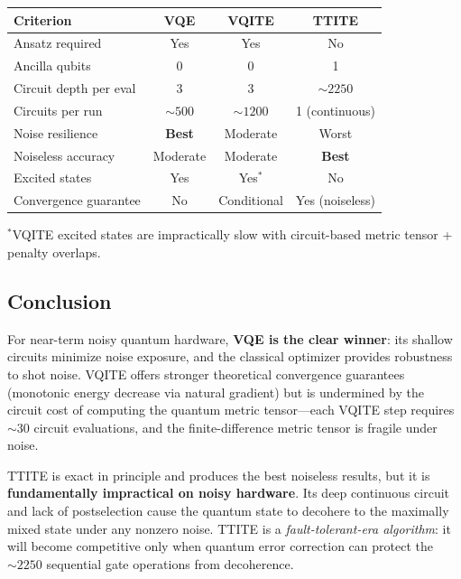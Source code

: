 \documentclass[11pt,a4paper]{article}
\begin{document}
\begin{center}
\begin{tabular}{@{}l c c c@{}}
\toprule
Criterion & VQE & VQITE & TTITE \\
\midrule
Ansatz required       & Yes & Yes & No \\
Ancilla qubits        & 0 & 0 & 1 \\
Circuit depth per eval & 3 & 3 & $\sim\!2250$ \\
Circuits per run      & $\sim\!500$ & $\sim\!1200$ & 1 (continuous) \\
Noise resilience      & \textbf{Best} & Moderate & Worst \\
Noiseless accuracy    & Moderate & Moderate & \textbf{Best} \\
Excited states        & Yes & Yes$^*$ & No \\
Convergence guarantee & No & Conditional & Yes (noiseless) \\
\bottomrule
\end{tabular}
\end{center}
{\small $^*$VQITE excited states are impractically slow with circuit-based
metric tensor + penalty overlaps.}

\subsection{Conclusion}

For near-term noisy quantum hardware, \textbf{VQE is the clear winner}:
its shallow circuits minimize noise exposure, and the classical optimizer
provides robustness to shot noise. VQITE offers stronger theoretical
convergence guarantees (monotonic energy decrease via natural gradient)
but is undermined by the circuit cost of computing the quantum metric
tensor---each VQITE step requires $\sim\!30$ circuit evaluations, and
the finite-difference metric tensor is fragile under noise.

TTITE is exact in principle and produces the best noiseless results, but
it is \textbf{fundamentally impractical on noisy hardware}. Its deep
continuous circuit and lack of postselection cause the quantum state to
decohere to the maximally mixed state under any nonzero noise. TTITE
is a \emph{fault-tolerant-era algorithm}: it will become competitive
only when quantum error correction can protect the $\sim\!2250$
sequential gate operations from decoherence.
\end{document}
